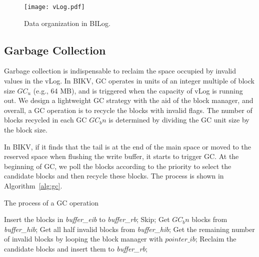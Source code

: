 \documentclass[sigconf]{acmart}
\begin{document}
\begin{figure}[!t]
	\setlength{\abovecaptionskip}{0.cm}	
	\setlength{\belowcaptionskip}{-0.cm}
	\centerline{\texttt{[image: vLog.pdf]}}
	\caption{Data organization in BILog.}
	\label{fig:ipbrLog}
\end{figure}

\subsection{Garbage Collection} \label{ss3}
Garbage collection is indispensable to reclaim the space occupied by invalid values in the vLog. In BIKV, GC operates in units of an integer multiple of block size $GC_u$ (e.g., 64 MB), and is triggered when the capacity of vLog is running out. We design a lightweight GC strategy with the aid of the block manager, and overall, a GC operation is to recycle the blocks with invalid flags. The number of blocks recycled in each GC $GC_bn$ is determined by dividing the GC unit size by the block size.

In BIKV, if it finds that the tail is at the end of the main space or moved to the reserved space when flushing the write buffer, it starts to trigger GC. At the beginning of GC, we poll the blocks according to the priority to select the candidate blocks and then recycle these blocks. The process is shown in Algorithm~\ref{alg:gc}.
\begin{algorithm}[htbp]
	\caption{The process of a GC operation}
		\begin{algorithmic}[1]
			\STATE Insert the blocks in \textit{buffer\_eib} to \textit{buffer\_rb}; 
			\ENDIF
			\STATE Skip;
			\ELSE
			\STATE Get $GC_bn$ blocks from \textit{buffer\_hib};
			\ELSE
			\STATE Get all half invalid blocks from \textit{buffer\_hib};  
			\STATE Get the remaining number of invalid blocks by looping the block manager with $pointer\_ib$;
			\ENDIF
			\ENDIF
			\STATE Reclaim the candidate blocks and insert them to \textit{buffer\_rb};
			\ENDIF
		\end{algorithmic}
	\label{alg:gc}
\end{algorithm}
\end{document}
